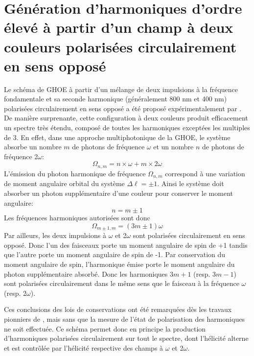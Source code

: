 \section[GHOE à partir d'un champ à deux couleurs polarisées circulairement en sens opposé]{Génération d'harmoniques d'ordre élevé à partir d'un champ à deux couleurs polarisées circulairement en sens opposé}
Le schéma de GHOE à partir d'un mélange de deux impulsions à la fréquence fondamentale et sa seconde harmonique (généralement 800 nm et 400 nm) polarisées circulairement en sens opposé a été proposé expérimentalement par . De manière surprenante, cette configuration à deux couleurs produit efficacement un spectre très étendu, composé de toutes les harmoniques exceptées les multiples de 3. En effet, dans une approche multiphotonique de la GHOE, le système absorbe un nombre $m$ de photons de fréquence $\omega$ et un nombre $n$ de photons de fréquence 2$\omega$: 
\begin{equation}
\Omega_{n,m} = n \times \omega + m \times 2 \omega
\end{equation}
L'émission du photon harmonique de fréquence $\Omega_{n,m}$ correspond à une variation de moment angulaire orbital du système $\Delta \ell = \pm 1$. Ainsi le système doit absorber un photon supplémentaire d'une couleur pour conserver le moment angulaire:
\begin{equation}
n = m \pm 1
\end{equation}
Les fréquences harmoniques autorisées sont donc
\begin{equation}
\Omega_{m \pm 1,m} = (3m \pm 1) \omega
\end{equation}
Par ailleurs, les deux impulsions à $\omega$ et 2$\omega$ sont polarisées circulairement en sens opposé. Donc l'un des faisceaux porte un moment angulaire de spin de +1 tandis que l'autre porte un moment angulaire de spin de -1. Par conservation du moment angulaire de spin, l'harmonique émise porte le moment angulaire du photon supplémentaire absorbé. Donc les harmoniques $3m+1$ (resp. $3m-1$) sont polarisées circulairement dans le même sens que le faisceau à la fréquence $\omega$ (resp. 2$\omega$).

Ces conclusions des lois de conservations ont été remarquées dès les travaux pionniers de , mais sans que la mesure de l'état de polarisation des harmoniques ne soit effectuée. Ce schéma permet donc en principe la production d'harmoniques polarisées circulairement sur tout le spectre, dont l'hélicité alterne et est contrôlée par l'hélicité respective des champs à $\omega$ et 2$\omega$.

